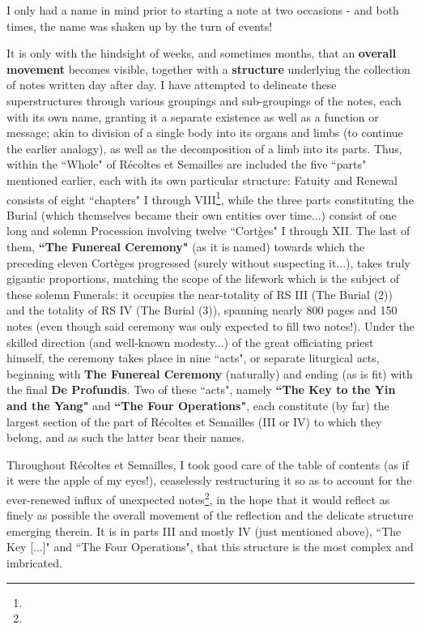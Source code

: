 I only had a name in mind prior to starting a note at two occasions - and both times, the name was shaken up by the turn of events!

It is only with the hindsight of weeks, and sometimes months, that an \textbf{overall movement} becomes visible, together with a \textbf{structure} underlying the collection of notes written day after day. I have attempted to delineate these superstructures through various groupings and sub-groupings of the notes, each with its own name, granting it a separate existence as well as a function or message; akin to division of a single body into its organs and limbs (to continue the earlier analogy), as well as the decomposition of a limb into its parts. Thus, within the ``Whole" of R\'ecoltes et Semailles are included the five ``parts" mentioned earlier, each with its own particular structure: Fatuity and Renewal consists of eight ``chapters" I through VIII\footnote{}, while the three parts constituting the Burial (which themselves became their own entities over time...) consist of one long and solemn Procession involving twelve ``Cort\`ges" I through XII. The last of them, \textbf{``The Funereal Ceremony"} (as it is named) towards which the preceding eleven Cort\`eges progressed (surely without suspecting it...), takes truly gigantic proportions, matching the scope of the lifework which is the subject of these solemn Funerals: it occupies the near-totality of RS III (The Burial (2)) and the totality of RS IV (The Burial (3)), spanning nearly 800 pages and 150 notes (even though said ceremony was only expected to fill two notes!). Under the skilled direction (and well-known modesty...) of the great officiating priest himself, the ceremony takes place in nine ``acts", or separate liturgical acts, beginning with \textbf{The Funereal Ceremony} (naturally) and ending (as is fit) with the final \textbf{De Profundis}. Two of these ``acts", namely \textbf{``The Key to the Yin and the Yang"} and \textbf{``The Four Operations"}, each constitute (by far) the largest section of the part of R\'ecoltes et Semailles (III or IV) to which they belong, and as such the latter bear their names.

Throughout R\'ecoltes et Semailles, I took good care of the table of contents (as if it were the apple of my eyes!), ceaselessly restructuring it so as to account for the ever-renewed influx of unexpected notes\footnote{}, in the hope that it would reflect as finely as possible the overall movement of the reflection and the delicate structure emerging therein. It is in parts III and mostly IV (just mentioned above), ``The Key [...]" and ``The Four Operations", that this structure is the most complex and imbricated. 

